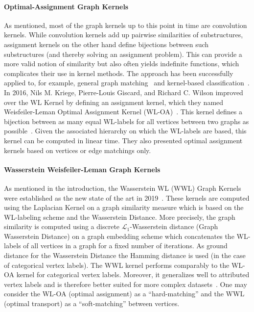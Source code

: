 		\paragraph{Optimal-Assignment Graph Kernels}
		As mentioned, most of the graph kernels up to this point in time are convolution kernels.	
		While convolution kernels add up pairwise similarities of substructures, assignment kernels on the other hand define bijections between such substructures (and thereby solving an assignment problem).
		This can provide a more valid notion of similarity but also often yields indefinite functions, which complicates their use in kernel methods.
		The approach has been successfully applied to, for example, general graph matching~\cite{2005_Gori_IEEE, 2009_Riesen_CONF} and kernel-based classification~\cite{2005_Froehlich_ICML, 2015_Bai_CONF, 2015_Schiavinato_CONF}.
		In 2016, Nils M. Kriege, Pierre-Louis Giscard, and Richard C. Wilson improved over the WL Kernel by defining an assignment kernel, which they named Weisfeiler-Leman Optimal Assignment Kernel (WL-OA)~\cite{2016_Kriege_NIPS}.
		This kernel defines a bijection between as many equal WL-labels for all vertices between two graphs as possible~\cite{2016_Kriege_NIPS}. %
		Given the associated hierarchy on which the WL-labels are based, this kernel can be computed in linear time.
		They also presented optimal assignment kernels based on vertices or edge matchings only.
		
		\paragraph{Wasserstein Weisfeiler-Leman Graph Kernels}
		As mentioned in the introduction, the Wasserstein WL (WWL) Graph Kernels were established as the new state of the art in 2019~\cite{2019_Togninalli_NIPS}.
		These kernels are computed using the Laplacian Kernel on a graph similarity measure which is based on the WL-labeling scheme and the Wasserstein Distance.
		More precisely, the graph similarity is computed using a discrete $\mathcal{L}_1$-Wasserstein distance (Graph Wasserstein Distance) on a graph embedding scheme which concatenates the WL-labels of all vertices in a graph for a fixed number of iterations.
		As ground distance for the Wasserstein Distance the Hamming distance is used (in the case of categorical vertex labels).		
		The WWL kernel performs comparably to the WL-OA kernel for categorical vertex labels.
		Moreover, it generalizes well to attributed vertex labels and is therefore better suited for more complex datasets~\cite{2019_Togninalli_NIPS}.
		One may consider the WL-OA (optimal assignment) as a \enquote{hard-matching} and the WWL (optimal transport) as a \enquote{soft-matching} between vertices.
		
